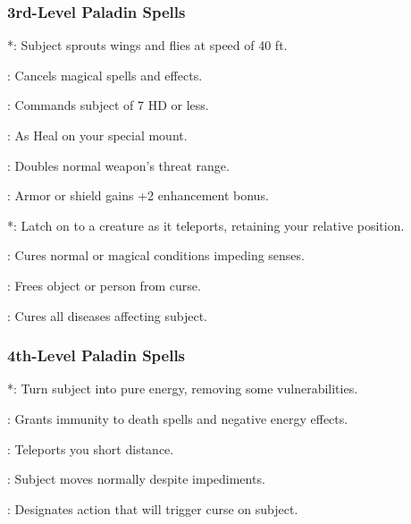 \subsubsection{3rd-Level Paladin Spells}
\begin{list}{}{\leftmargin=1em}
 \item {}*: Subject sprouts wings and flies at speed of 40 ft.
 \item {}: Cancels magical spells and effects.
 \item {}: Commands subject of 7 HD or less.
 \item {}: As Heal on your special mount.
 \item {}: Doubles normal weapon's threat range.
 \item {}: Armor or shield gains +2 enhancement bonus.
 \item {}*: Latch on to a creature as it teleports, retaining your relative position.
 \item {}: Cures normal or magical conditions impeding senses.
 \item {}: Frees object or person from curse.
 \item {}: Cures all diseases affecting subject.
\end{list}
\subsubsection{4th-Level Paladin Spells}
\begin{list}{}{\leftmargin=1em}
 \item {}*: Turn subject into pure energy, removing some vulnerabilities.
 \item {}: Grants immunity to death spells and negative energy effects.
 \item {}: Teleports you short distance.
 \item {}: Subject moves normally despite impediments.
 \item {}: Designates action that will trigger curse on subject.
\end{list}
